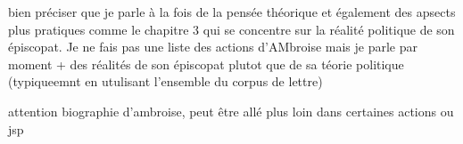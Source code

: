 bien préciser que je parle à la fois de la pensée théorique et également des apsects plus pratiques comme le chapitre 3 qui se concentre sur la réalité politique de son épiscopat.
Je ne fais pas une liste des actions d'AMbroise mais je parle par moment + des réalités de son épiscopat plutot que de sa téorie politique (typiqueemnt en utulisant l'ensemble du corpus de lettre)

attention biographie d'ambroise, peut être allé plus loin dans certaines actions ou jsp

